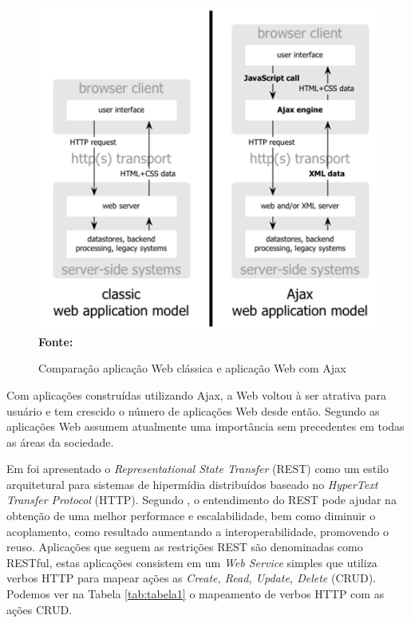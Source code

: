 \begin{figure}[!ht]
	\centering	
	\caption[\hspace{0.1cm}Comparação aplicação Web clássica e aplicação Web com Ajax.]{Comparação aplicação Web clássica e aplicação Web com Ajax}
	  \vspace{-0.4cm}
	\includegraphics[width=.6\textwidth]{figuras/ajax_comparison.png}
	 \vspace{-0.3cm}
	\\\textbf{\footnotesize Fonte: \cite{garrettAjax}}
	\label{fig:ajax_comparison}
\end{figure}


Com aplicações construídas utilizando Ajax, a Web voltou à ser atrativa para usuário e tem crescido o número de aplicações Web desde então. Segundo
\cite{tabulaRest} as aplicações Web assumem atualmente uma importância sem precedentes em todas as áreas da sociedade. 

Em \cite{fieldingRest} foi apresentado o \textit{Representational State Transfer} (REST) como um estilo arquitetural para sistemas de hipermídia 
distribuídos baseado no \textit{HyperText Transfer Protocol} (HTTP). Segundo \cite{modelingRestful}, o entendimento do REST pode ajudar na obtenção 
de uma melhor performace e escalabilidade, bem como diminuir o acoplamento, como resultado aumentando a interoperabilidade, promovendo o reuso. 
Aplicações que seguem as restrições REST são denominadas como RESTful, estas aplicações consistem em um \textit{Web Service} simples que utiliza 
verbos HTTP para mapear ações as \textit{Create, Read, Update, Delete} (CRUD). Podemos ver na Tabela \ref{tab:tabela1} o mapeamento de verbos HTTP 
com as ações CRUD.


